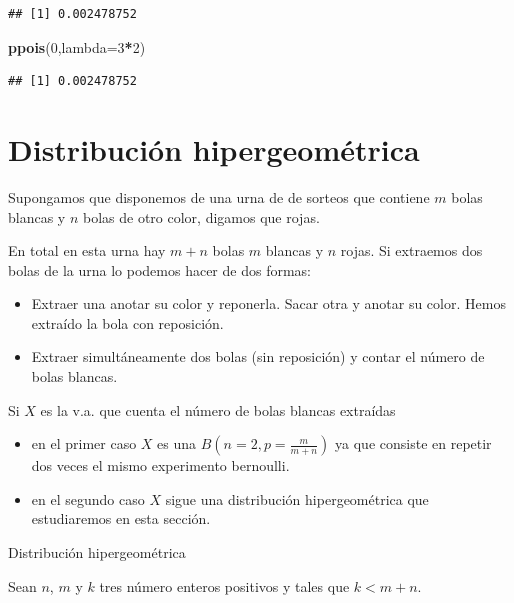 \documentclass[]{book}
\newenvironment{Shaded}{\begin{snugshade}}{\end{snugshade}}
\newcommand{\DataTypeTok}[1]{\textcolor[rgb]{0.13,0.29,0.53}{#1}}
\newcommand{\DecValTok}[1]{\textcolor[rgb]{0.00,0.00,0.81}{#1}}
\newcommand{\KeywordTok}[1]{\textcolor[rgb]{0.13,0.29,0.53}{\textbf{#1}}}
\newcommand{\NormalTok}[1]{#1}
\newcommand{\OperatorTok}[1]{\textcolor[rgb]{0.81,0.36,0.00}{\textbf{#1}}}
\providecommand{\tightlist}{%
  \setlength{\itemsep}{0pt}\setlength{\parskip}{0pt}}
\begin{document}
\begin{verbatim}
## [1] 0.002478752
\end{verbatim}

\begin{Shaded}
\begin{Highlighting}[]
\KeywordTok{ppois}\NormalTok{(}\DecValTok{0}\NormalTok{,}\DataTypeTok{lambda=}\DecValTok{3}\OperatorTok{*}\DecValTok{2}\NormalTok{)}
\end{Highlighting}
\end{Shaded}

\begin{verbatim}
## [1] 0.002478752
\end{verbatim}

\hypertarget{distribuciuxf3n-hipergeomuxe9trica}{%
\section{Distribución hipergeométrica}\label{distribuciuxf3n-hipergeomuxe9trica}}

Supongamos que disponemos de una urna de de sorteos que contiene \(m\) bolas blancas y \(n\) bolas de otro color, digamos que rojas.

En total en esta urna hay \(m+n\) bolas \(m\) blancas y \(n\) rojas. Si extraemos dos bolas de la urna lo podemos hacer de dos formas:

\begin{itemize}
\tightlist
\item
  Extraer una anotar su color y reponerla. Sacar otra y anotar su color. Hemos extraído la bola con reposición.
\item
  Extraer simultáneamente dos bolas (sin reposición) y contar el número de bolas blancas.
\end{itemize}

Si \(X\) es la v.a. que cuenta el número de bolas blancas extraídas

\begin{itemize}
\tightlist
\item
  en el primer caso \(X\) es una \(B(n=2,p=\frac{m}{m+n})\) ya que consiste en repetir dos veces el mismo experimento bernoulli.
\item
  en el segundo caso \(X\) sigue una distribución hipergeométrica que estudiaremos en esta sección.
\end{itemize}

 Distribución hipergeométrica

Sean \(n\), \(m\) y \(k\) tres número enteros positivos y tales que \(k<m+n\).
\end{document}
